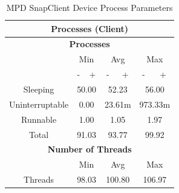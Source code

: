 \documentclass[11pt,a4paper,headinclude=false,footinclude=false]{scrreprt}
\begin{document}
\begin{table}[H]
\centering
    \begin{tabular}{||c|c|c|c|c|c|c||}
    \hline
    \multicolumn{7}{|c|}{\textbf{Processes (Client)}} \\
    \hline
    \multicolumn{7}{|c|}{\textbf{Processes}} \\
    \hline\hline
      & \multicolumn{2}{|c|}{Min} & \multicolumn{2}{|c|}{Avg} & \multicolumn{2}{|c|}{Max} \\
    \hline
      & - & + & - & + & - & + \\
    \hline
    Sleeping & \multicolumn{2}{|c|}{50.00} & \multicolumn{2}{|c|}{52.23} & \multicolumn{2}{|c|}{56.00} \\
    \hline
    Uninterruptable & \multicolumn{2}{|c|}{0.00} & \multicolumn{2}{|c|}{23.61m} & \multicolumn{2}{|c|}{973.33m} \\
    \hline
    Runnable & \multicolumn{2}{|c|}{1.00} & \multicolumn{2}{|c|}{1.05} & \multicolumn{2}{|c|}{1.97} \\
    \hline
    Total & \multicolumn{2}{|c|}{91.03} & \multicolumn{2}{|c|}{93.77} & \multicolumn{2}{|c|}{99.92} \\
    \hline\hline
    \multicolumn{7}{|c|}{\textbf{Number of Threads}} \\
    \hline\hline
      & \multicolumn{2}{|c|}{Min} & \multicolumn{2}{|c|}{Avg} & \multicolumn{2}{|c|}{Max} \\
    \hline
    Threads  & \multicolumn{2}{|c|}{98.03} & \multicolumn{2}{|c|}{100.80} & \multicolumn{2}{|c|}{106.97} \\
    \hline\hline
    \end{tabular}
    \caption{MPD SnapClient Device Process Parameters}
    \label{MPDclientProcessTab}
\end{table}
\end{document}
